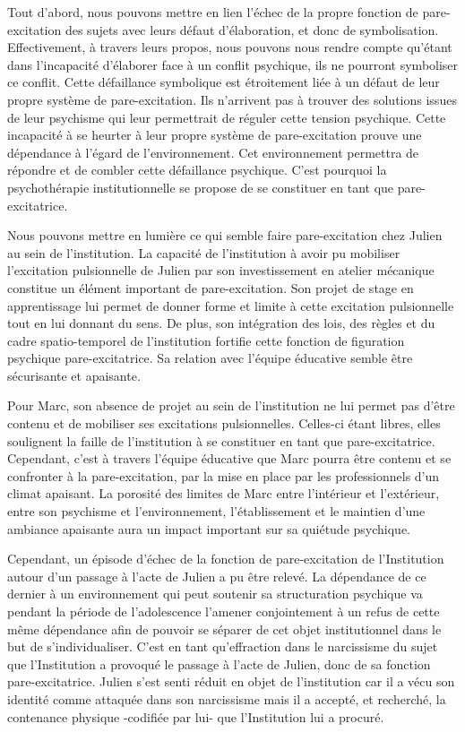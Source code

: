 \documentclass[12pt, a4paper]{book}
\begin{document}
\begin{spacing}{1.5}
Tout d'abord, nous pouvons mettre en lien l'échec de la propre fonction de pare-excitation des sujets avec leurs défaut d'élaboration, et donc de symbolisation. Effectivement, à travers leurs propos, nous pouvons nous rendre compte qu'étant dans l'incapacité d'élaborer face à un conflit psychique, ils ne pourront symboliser ce conflit. Cette défaillance symbolique est étroitement liée à un défaut de leur propre système de pare-excitation. Ils n'arrivent pas à trouver des solutions issues de leur psychisme qui leur permettrait de réguler cette tension psychique. Cette incapacité à se heurter à leur propre système de pare-excitation prouve une dépendance à l'égard de l'environnement. Cet environnement permettra de répondre et de combler cette défaillance psychique. C'est pourquoi la psychothérapie institutionnelle se propose de se constituer en tant que pare-excitatrice.

Nous pouvons mettre en lumière ce qui semble faire pare-excitation chez Julien au sein de l'institution. La capacité de l'institution à avoir pu mobiliser l'excitation pulsionnelle de Julien par son investissement en atelier mécanique constitue un élément important de pare-excitation. Son projet de stage en apprentissage lui permet de donner forme et limite à cette excitation pulsionnelle tout en lui donnant du sens. De plus, son intégration des lois, des règles et du cadre spatio-temporel de l'institution fortifie cette fonction de figuration psychique pare-excitatrice. Sa relation avec l'équipe éducative semble être sécurisante et apaisante. 

Pour Marc, son absence de projet au sein de l'institution ne lui permet pas d'être contenu  et de mobiliser ses excitations pulsionnelles. Celles-ci étant libres, elles soulignent la faille de l'institution à se constituer en tant que pare-excitatrice. Cependant, c'est à travers l'équipe éducative que Marc pourra être contenu et se confronter à la pare-excitation, par la mise en place par les professionnels d'un climat apaisant. La porosité des limites de Marc entre l'intérieur et l'extérieur, entre son psychisme et l'environnement, l'établissement et le maintien d'une ambiance apaisante aura un impact important sur sa quiétude psychique.

Cependant, un épisode d'échec de la fonction de pare-excitation de l'Institution autour d'un passage à l'acte de Julien a pu être relevé. La dépendance de ce dernier à un environnement qui peut soutenir sa structuration psychique va pendant la période de l'adolescence  l'amener conjointement  à un refus de cette même dépendance afin de pouvoir se séparer de cet objet institutionnel dans le but de s'individualiser. C'est en tant qu'effraction dans le narcissisme du sujet  que l'Institution a provoqué le passage à l'acte de Julien, donc de sa fonction pare-excitatrice. Julien s'est senti réduit en  objet de l'institution car il a vécu son identité comme attaquée dans son narcissisme mais il a accepté, et recherché, la contenance physique -codifiée par lui- que l'Institution lui a procuré.


\end{spacing}
\end{document}
